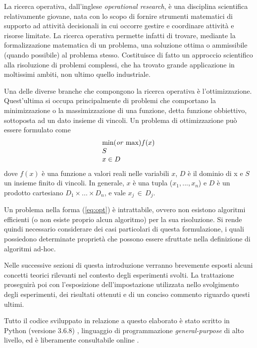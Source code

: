 La ricerca operativa, dall'inglese \textit{operational research}, è una disciplina scientifica relativamente 
giovane, nata con lo scopo di fornire strumenti matematici di supporto ad attività decisionali in cui occorre gestire e coordinare 
attività e risorse limitate. La ricerca operativa permette infatti di trovare, mediante la formalizzazione 
matematica di un problema, una soluzione ottima o ammissibile (quando possibile) al problema stesso. 
Costituisce di fatto un approccio scientifico alla risoluzione di problemi 
complessi, che ha trovato grande applicazione in moltissimi ambiti, non ultimo quello industriale. 

Una delle diverse branche che compongono la ricerca operativa è l'ottimizzazione. 
Quest'ultima si occupa principalmente di problemi che comportano la minimizzazione o la massimizzazione di una funzione, detta funzione
obbiettivo, sottoposta ad un dato insieme di vincoli. 
Un problema di ottimizzazione può essere formulato come 
\begin{align}
	\label{eq:opt}
	\begin{array}{l}
      \text{min(\textit{or} max)}f(x)\\
      S	\\
      x \in D
    \end{array}
\end{align}
dove $f(x)$ è una funzione a valori reali nelle variabili $x$, $D$ è il dominio di x e $S$ un insieme finito di vincoli. In generale,  
$x$ è una tupla ($x_1,...,x_n$) e $D$ è un prodotto cartesiano $D_1 \times ... \times D_n$, e vale $x_j \, \in \, D_j$. 

Un problema nella forma (\ref{eq:opt}) è intrattabile, ovvero non esistono algoritmi efficienti (o non esiste proprio
alcun algoritmo) per la sua risoluzione. Si rende quindi necessario considerare dei casi particolari di questa formulazione, i quali 
possiedono determinate proprietà che possono essere sfruttate nella definizione di algoritmi ad-hoc.
\newpage

Nelle successive sezioni di questa introduzione verranno brevemente esposti alcuni concetti teorici rilevanti nel contesto degli 
esperimenti svolti. La trattazione proseguirà poi con l'esposizione dell'impostazione utilizzata nello svolgimento degli
esperimenti, dei risultati ottenuti e di un conciso commento riguardo questi ultimi. 

\noindent
Tutto il codice sviluppato in relazione a questo elaborato è stato scritto in Python (versione 3.6.8) \cite{python}, linguaggio di programmazione \textit{general-purpose} di alto livello,  ed è liberamente consultabile online \cite{repository}.